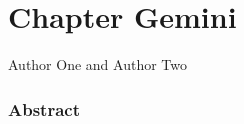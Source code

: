 \chapter[Gemini chapter entry for ToC]{Chapter Gemini}

\hyphenation{}

{\large\color{eurgreen} Author One and Author Two}
\emptyline
\emptyline
\emptyline


\subsection*{Abstract}
\blindtext
\clearpage

\blindmathpaper
